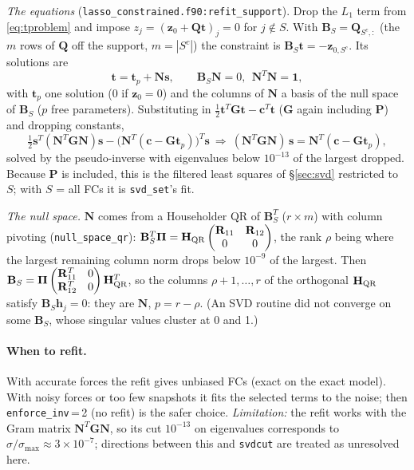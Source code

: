 \documentclass[11pt,a4paper]{article}
\newcommand{\bB}{\mathbf B}
\newcommand{\bG}{\mathbf G}
\newcommand{\bH}{\mathbf H}
\newcommand{\bN}{\mathbf N}
\newcommand{\bP}{\mathbf P}
\newcommand{\bQ}{\mathbf Q}
\newcommand{\bR}{\mathbf R}
\newcommand{\bc}{\mathbf c}
\newcommand{\bs}{\mathbf s}
\newcommand{\bt}{\mathbf t}
\newcommand{\bz}{\mathbf z}
\newcommand{\code}[1]{\texttt{#1}}
\begin{document}
\emph{The equations} (\code{lasso\_constrained.f90:refit\_support}). Drop the $L_1$ term from \eqref{eq:tproblem} and impose
$z_j=(\bz_0+\bQ\bt)_j=0$ for $j\notin S$. With $\bB_S=\bQ_{S^c,:}$ (the $m$ rows of $\bQ$ off the support, $m=|S^c|$) the
constraint is $\bB_S\bt=-\bz_{0,S^c}$. Its solutions are
\begin{equation}
\bt=\bt_p+\bN\bs,\qquad \bB_S\bN=0,\ \ \bN^T\bN=\mathbf 1,
\end{equation}
with $\bt_p$ one solution (0 if $\bz_0=0$) and the columns of $\bN$ a basis of the null space of $\bB_S$ ($p$ free parameters).
Substituting in $\tfrac12\bt^T\bG\bt-\bc^T\bt$ ($\bG$ again including $\bP$) and dropping constants,
\begin{equation}
\tfrac12\bs^T(\bN^T\bG\bN)\bs-\big(\bN^T(\bc-\bG\bt_p)\big)^T\bs
\ \Rightarrow\ (\bN^T\bG\bN)\,\bs=\bN^T(\bc-\bG\bt_p) ,
\end{equation}
solved by the pseudo-inverse with eigenvalues below $10^{-13}$ of the largest dropped. Because $\bP$ is included, this is the
filtered least squares of \S\ref{sec:svd} restricted to $S$; with $S$ = all FCs it is \code{svd\_set}'s fit.

\emph{The null space.} $\bN$ comes from a Householder QR of $\bB_S^T$ ($r\times m$) with column pivoting
(\code{null\_space\_qr}): $\bB_S^T\boldsymbol\Pi=\bH_{\rm QR}\begin{pmatrix}\bR_{11}&\bR_{12}\\0&0\end{pmatrix}$, the rank $\rho$ being where the largest remaining
column norm drops below $10^{-9}$ of the largest. Then $\bB_S=\boldsymbol\Pi\begin{pmatrix}\bR_{11}^T&0\\\bR_{12}^T&0\end{pmatrix}\bH_{\rm QR}^T$, so the columns
$\rho+1,\dots,r$ of the orthogonal $\bH_{\rm QR}$ satisfy $\bB_S\mathbf h_j=0$: they are $\bN$, $p=r-\rho$. (An SVD routine did not converge
on some $\bB_S$, whose singular values cluster at 0 and 1.)

\paragraph{When to refit.} With accurate forces the refit gives unbiased FCs (exact on the exact model). With noisy forces or too
few snapshots it fits the selected terms to the noise; then \code{enforce\_inv}\,=\,2 (no refit) is the safer choice.
\emph{Limitation:} the refit works with the Gram matrix $\bN^T\bG\bN$, so its cut $10^{-13}$ on eigenvalues corresponds to
$\sigma/\sigma_{\max}\approx3\times10^{-7}$; directions between this and \code{svdcut} are treated as unresolved here.
\end{document}

